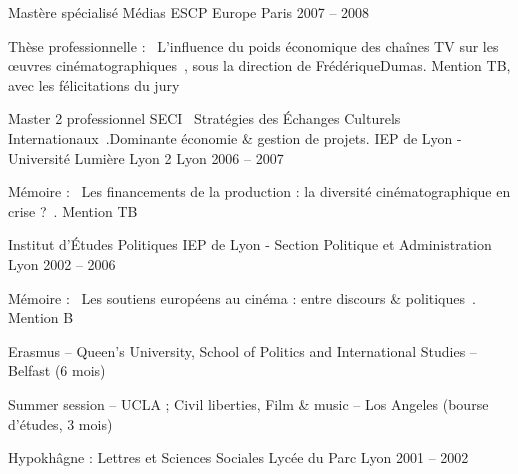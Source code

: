 
\begin{cventries}

  \cventry
    {Mastère spécialisé Médias} %
    {ESCP Europe} %
    {Paris} %
    {2007 – 2008} %
    {
      \begin{cvitems}
        \item {Thèse professionnelle : \guillemotleft~L’influence du poids économique des chaînes TV sur les œuvres cinématographiques~\guillemotright, sous la direction de Frédérique\nobreakspace Dumas. Mention TB, avec les félicitations du jury}
      \end{cvitems}
    }

  \cventry
    {Master 2 professionnel SECI \guillemotleft~Stratégies des Échanges Culturels Internationaux~\guillemotright.\newline Dominante économie \& gestion de projets.} %
    {IEP de Lyon - Université Lumière Lyon 2} %
    {Lyon} %
    {2006 – 2007} %
    {
      \begin{cvitems}
        \item {Mémoire : \guillemotleft~Les financements de la production : la diversité cinématographique en crise ?~\guillemotright. Mention TB}
      \end{cvitems}
    }

  \cventry
    {Institut d’Études Politiques} %
    {IEP de Lyon - Section Politique et Administration} %
    {Lyon} %
    {2002 – 2006} %
    {
      \begin{cvitems}
        \item {Mémoire : \guillemotleft~Les soutiens européens au cinéma : entre discours \& politiques~\guillemotright. Mention B}
        \item {Erasmus – Queen’s University, School of Politics and International Studies – Belfast (6 mois)}
        \item {Summer session – UCLA ; Civil liberties, Film \& music – Los Angeles (bourse d’études, 3 mois)}
      \end{cvitems}
    }

  \cventry
    {Hypokhâgne : Lettres et Sciences Sociales} %
    {Lycée du Parc} %
    {Lyon} %
    {2001 – 2002} %
    {} %
    \vspace{-0.4cm}

\end{cventries}
